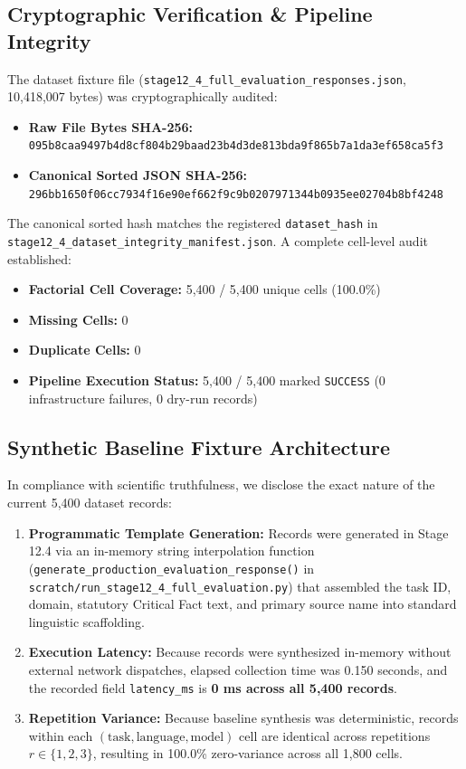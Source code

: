 \documentclass[11pt,a4paper]{article}
\begin{document}
\subsection{Cryptographic Verification \& Pipeline Integrity}
\label{sec:crypto_integrity}

The dataset fixture file (\texttt{stage12\_4\_full\_evaluation\_responses.json}, 10,418,007 bytes) was cryptographically audited:
\begin{itemize}
  \item \textbf{Raw File Bytes SHA-256:} \texttt{095b8caa9497b4d8cf804b29baad23b4d3de813bda9f865b7a1da3ef658ca5f3}
  \item \textbf{Canonical Sorted JSON SHA-256:} \texttt{296bb1650f06cc7934f16e90ef662f9c9b0207971344b0935ee02704b8bf4248}
\end{itemize}

The canonical sorted hash matches the registered \texttt{dataset\_hash} in \texttt{stage12\_4\_dataset\_integrity\_manifest.json}. A complete cell-level audit established:
\begin{itemize}
  \item \textbf{Factorial Cell Coverage:} 5,400 / 5,400 unique cells (100.0\%)
  \item \textbf{Missing Cells:} 0
  \item \textbf{Duplicate Cells:} 0
  \item \textbf{Pipeline Execution Status:} 5,400 / 5,400 marked \texttt{SUCCESS} (0 infrastructure failures, 0 dry-run records)
\end{itemize}

\subsection{Synthetic Baseline Fixture Architecture}
\label{sec:fixture_architecture}

In compliance with scientific truthfulness, we disclose the exact nature of the current 5,400 dataset records:
\begin{enumerate}
  \item \textbf{Programmatic Template Generation:} Records were generated in Stage 12.4 via an in-memory string interpolation function (\texttt{generate\_production\_evaluation\_response()} in \texttt{scratch/run\_stage12\_4\_full\_evaluation.py}) that assembled the task ID, domain, statutory Critical Fact text, and primary source name into standard linguistic scaffolding.
  \item \textbf{Execution Latency:} Because records were synthesized in-memory without external network dispatches, elapsed collection time was 0.150 seconds, and the recorded field \texttt{latency\_ms} is \textbf{0 ms across all 5,400 records}.
  \item \textbf{Repetition Variance:} Because baseline synthesis was deterministic, records within each $(\text{task}, \text{language}, \text{model})$ cell are identical across repetitions $r \in \{1, 2, 3\}$, resulting in 100.0\% zero-variance across all 1,800 cells.
\end{enumerate}
\end{document}
